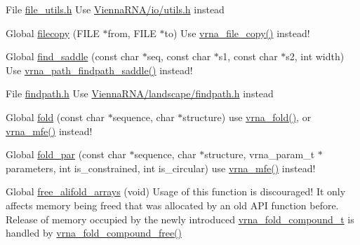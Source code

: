 \begin{DoxyRefList}
\item[File \mbox{\hyperlink{file__utils_8h}{file\+\_\+utils.h}} ]\label{deprecated__deprecated000063}%
%
Use \mbox{\hyperlink{io_2utils_8h}{Vienna\+RNA/io/utils.\+h}} instead  
\item[Global \mbox{\hyperlink{utils_2basic_8h_ab213334ce977b6d21611cdea6b80c3bf}{filecopy}} (FILE $\ast$from, FILE $\ast$to)]\label{deprecated__deprecated000193}%
%
Use \mbox{\hyperlink{group__file__utils_ga4382a56d2fee9ed738364b99329edc7c}{vrna\+\_\+file\+\_\+copy()}} instead!  
\item[Global \mbox{\hyperlink{group__paths__deprecated_ga4c0dabf032c04eeab9c7370d15db6ad2}{find\+\_\+saddle}} (const char $\ast$seq, const char $\ast$s1, const char $\ast$s2, int width)]\label{deprecated__deprecated000168}%
%
Use \mbox{\hyperlink{group__paths__direct_gad77dbfa125158f534147c0015a849bc3}{vrna\+\_\+path\+\_\+findpath\+\_\+saddle()}} instead! 
\item[File \mbox{\hyperlink{findpath_8h}{findpath.h}} ]\label{deprecated__deprecated000064}%
%
Use \mbox{\hyperlink{landscape_2findpath_8h}{Vienna\+RNA/landscape/findpath.\+h}} instead  
\item[Global \mbox{\hyperlink{group__mfe__global__deprecated_gaadafcb0f140795ae62e5ca027e335a9b}{fold}} (const char $\ast$sequence, char $\ast$structure)]\label{deprecated__deprecated000066}%
%
use \mbox{\hyperlink{group__mfe__global_ga29a33b2895f4e67b0480271ff289afdc}{vrna\+\_\+fold()}}, or \mbox{\hyperlink{group__mfe__global_gabd3b147371ccf25c577f88bbbaf159fd}{vrna\+\_\+mfe()}} instead! 
\item[Global \mbox{\hyperlink{group__mfe__global__deprecated_ga2bc41df5d71fee6fd8da9904ee65d8fb}{fold\+\_\+par}} (const char $\ast$sequence, char $\ast$structure, vrna\+\_\+param\+\_\+t $\ast$parameters, int is\+\_\+constrained, int is\+\_\+circular)]\label{deprecated__deprecated000065}%
%
use \mbox{\hyperlink{group__mfe__global_gabd3b147371ccf25c577f88bbbaf159fd}{vrna\+\_\+mfe()}} instead! 
\item[Global \mbox{\hyperlink{group__mfe__global__deprecated_ga72095e4554b5d577250ea14c42acc49e}{free\+\_\+alifold\+\_\+arrays}} (void)]\label{deprecated__deprecated000014}%
%
Usage of this function is discouraged! It only affects memory being free\textquotesingle{}d that was allocated by an old API function before. Release of memory occupied by the newly introduced \mbox{\hyperlink{group__fold__compound_ga1b0cef17fd40466cef5968eaeeff6166}{vrna\+\_\+fold\+\_\+compound\+\_\+t}} is handled by \mbox{\hyperlink{group__fold__compound_ga576a077b418a9c3650e06f8e5d296fc2}{vrna\+\_\+fold\+\_\+compound\+\_\+free()}} 

\end{DoxyRefList}
